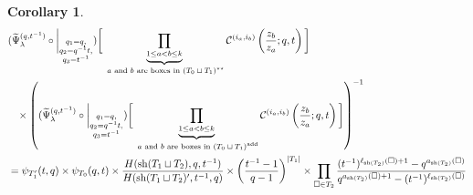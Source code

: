 \documentclass[12pt,reqno,a4paper]{amsart}
\newcommand{\comp}{\circ}
\newcommand{\cals}[1]{\mathcal{#1}}
\numberwithin{equation}{section}
\newtheorem{cor}[thm]{Corollary}
\theoremstyle{definition}
\begin{document}
\begin{cor}\mbox{}
\label{cor311-1128-27jul}
\footnotesize
\begin{align}
	&
	(
	\widetilde{\Psi}_{\lambda}^{(q,t^{-1})}
	\comp 
	\bigg|_{
		\substack{
			q_1 = q, \\
			q_2 = q^{-1}t,\\
			q_3 = t^{-1} \\
		}
	}
	)
	\bigg[
	\underbrace{	\prod_{1 \leq a < b \leq k}				}_{\text{ $a$ and $b$ are boxes in $(T_0 \sqcup T_1)^{\star\star}$}}
	\cals{C}^{(i_a,i_b)}\left(
	\frac{z_b}{z_a}
	; q, t
	\right)
	\bigg]
	\\
	&\hspace{0.3cm}\times
	\left(
	(
	\widetilde{\Psi}_{\lambda}^{(q,t^{-1})}
	\comp 
	\bigg|_{
		\substack{
			q_1 = q, \\
			q_2 = q^{-1}t,\\
			q_3 = t^{-1} \\
		}
	}
	)
	\bigg[
	\underbrace{	\prod_{1 \leq a < b \leq k}				}_{\text{ $a$ and $b$ are boxes in $(T_0 \sqcup T_1)^{\operatorname{add}}$}}
	\cals{C}^{(i_a,i_b)}\left(
	\frac{z_b}{z_a}
	; q, t
	\right)
	\bigg]
	\right)^{-1}
	\notag 
	\\
	&=  
	\psi_{T^{\prime}_{1}}(t,q) \times \psi_{T_0}(q,t)
	\times
	\frac{
		H(\operatorname{sh}(T_1 \sqcup T_2),q,t^{-1})
	}{
		H(\operatorname{sh}(T_1 \sqcup T_2)^\prime,t^{-1},q)
	}
	\times
	\left(	\frac{t^{-1} - 1}{q-1}		\right)^{|T_1|}
	\notag 
	\times 
	\prod_{\square \in T_2}
	\frac{
		(t^{-1})^{\ell_{\operatorname{sh}(T_2)}(\square) + 1} - q^{a_{\operatorname{sh}(T_2)}(\square)}
	}{
		q^{a_{\operatorname{sh}(T_2)}(\square) + 1} - (t^{-1})^{\ell_{\operatorname{sh}(T_2)}(\square)}
	}
	\notag 
\end{align}
\normalsize
\end{cor}
\end{document}
